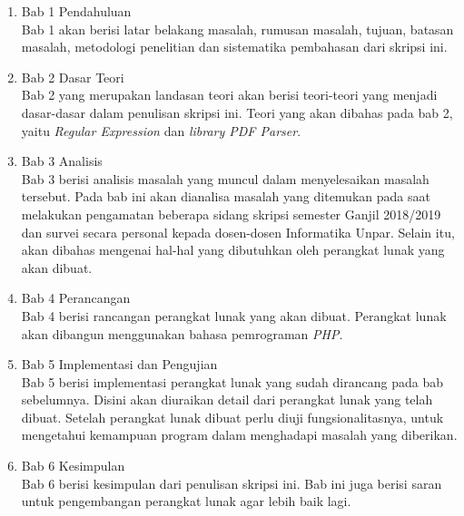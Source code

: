 \begin{enumerate}
	\item Bab 1 Pendahuluan
	\\
	Bab 1 akan berisi latar belakang masalah, rumusan masalah, tujuan, batasan masalah, metodologi penelitian dan sistematika pembahasan dari skripsi ini.

	\item Bab 2 Dasar Teori
	\\
	Bab 2 yang merupakan landasan teori akan berisi teori-teori yang menjadi dasar-dasar dalam penulisan skripsi ini. Teori yang akan dibahas pada bab 2, yaitu \textit{Regular Expression} dan \textit{library PDF Parser}.
	
	\item Bab 3 Analisis
	\\
	Bab 3 berisi analisis masalah yang muncul dalam menyelesaikan masalah tersebut. Pada bab ini akan dianalisa masalah yang ditemukan pada saat melakukan pengamatan beberapa sidang skripsi semester Ganjil 2018/2019 dan survei secara personal kepada dosen-dosen Informatika Unpar. Selain itu, akan dibahas mengenai hal-hal yang dibutuhkan oleh perangkat lunak yang akan dibuat.
	
	\item Bab 4 Perancangan
	\\
	Bab 4 berisi rancangan perangkat lunak yang akan dibuat. Perangkat lunak akan dibangun menggunakan bahasa pemrograman \textit{PHP}.
	
	\item Bab 5 Implementasi dan Pengujian
	\\
	Bab 5 berisi implementasi perangkat lunak yang sudah dirancang pada bab sebelumnya. Disini akan diuraikan detail dari perangkat lunak yang telah dibuat. Setelah perangkat lunak dibuat perlu diuji fungsionalitasnya, untuk mengetahui kemampuan program dalam menghadapi masalah yang diberikan. 
	
	\item Bab 6 Kesimpulan
	\\
	Bab 6 berisi kesimpulan dari penulisan skripsi ini. Bab ini juga berisi saran untuk pengembangan perangkat lunak agar lebih baik lagi.
\end{enumerate}